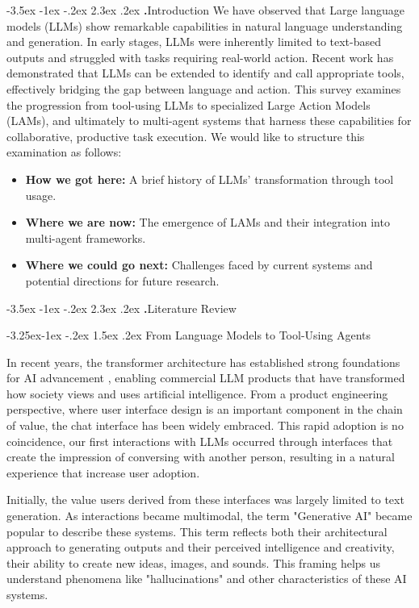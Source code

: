 \documentclass[journal,twoside,10pt]{IEEEtran}
\makeatletter
\renewcommand\section{\@startsection{section}{1}{\z@}%
                       {-3.5ex \@plus -1ex \@minus -.2ex}%
                       {2.3ex \@plus.2ex}%
                       {\normalfont\Large\bfseries\Roman{section}.\quad}}
\renewcommand\subsection{\@startsection{subsection}{2}{\z@}%
                       {-3.25ex\@plus -1ex \@minus -.2ex}%
                       {1.5ex \@plus .2ex}%
                       {\normalfont\large\bfseries}}
\makeatother
\begin{document}
\section{Introduction}
We have observed that Large language models (LLMs) show remarkable capabilities in natural language understanding and generation. 
In early stages, LLMs were inherently limited to text-based outputs and struggled with tasks requiring real-world action. 
Recent work has demonstrated that LLMs can be extended to identify and call appropriate tools, effectively bridging the gap between language and action. 
This survey examines the progression from tool-using LLMs to specialized Large Action Models (LAMs), and ultimately to multi-agent systems that harness these capabilities for collaborative, productive task execution.
We would like to structure this examination as follows:
\begin{itemize}
    \item \textbf{How we got here:} A brief history of LLMs' transformation through tool usage.
    \item \textbf{Where we are now:} The emergence of LAMs and their integration into multi-agent frameworks.
    \item \textbf{Where we could go next:} Challenges faced by current systems and potential directions for future research.
\end{itemize}

\section{Literature Review}

\subsection{From Language Models to Tool-Using Agents}

In recent years, the transformer architecture has established strong foundations for AI advancement , enabling commercial LLM products that have transformed how society views and uses artificial intelligence. From a product engineering perspective, where user interface design is an important component in the chain of value, the chat interface has been widely embraced. This rapid adoption is no coincidence, our first interactions with LLMs occurred through interfaces that create the impression of conversing with another person, resulting in a natural experience that increase user adoption.

Initially, the value users derived from these interfaces was largely limited to text generation. As interactions became multimodal, the term "Generative AI" became popular to describe these systems. This term reflects both their architectural approach to generating outputs and their perceived intelligence and creativity, their ability to create new ideas, images, and sounds. This framing helps us understand phenomena like "hallucinations" and other characteristics of these AI systems.
\end{document}
